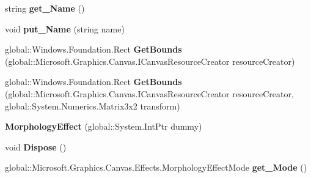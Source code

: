 \begin{DoxyCompactItemize}
\item 
\mbox{\label{class_microsoft_1_1_graphics_1_1_canvas_1_1_effects_1_1_morphology_effect_a255bc7bed18329d2c61fac107439dea6}} 
string {\bfseries get\+\_\+\+Name} ()
\item 
\mbox{\label{class_microsoft_1_1_graphics_1_1_canvas_1_1_effects_1_1_morphology_effect_a013f5c2e209a17200348842a621476bf}} 
void {\bfseries put\+\_\+\+Name} (string name)
\item 
\mbox{\label{class_microsoft_1_1_graphics_1_1_canvas_1_1_effects_1_1_morphology_effect_a4cc93d1ce89bb136bf248b44ce57e0cc}} 
global\+::\+Windows.\+Foundation.\+Rect {\bfseries Get\+Bounds} (global\+::\+Microsoft.\+Graphics.\+Canvas.\+I\+Canvas\+Resource\+Creator resource\+Creator)
\item 
\mbox{\label{class_microsoft_1_1_graphics_1_1_canvas_1_1_effects_1_1_morphology_effect_af73df5ff1be6441e88acfd8ace44c35a}} 
global\+::\+Windows.\+Foundation.\+Rect {\bfseries Get\+Bounds} (global\+::\+Microsoft.\+Graphics.\+Canvas.\+I\+Canvas\+Resource\+Creator resource\+Creator, global\+::\+System.\+Numerics.\+Matrix3x2 transform)
\item 
\mbox{\label{class_microsoft_1_1_graphics_1_1_canvas_1_1_effects_1_1_morphology_effect_a2d9ece50b1dd157dfb4ba3fd5a775b2b}} 
{\bfseries Morphology\+Effect} (global\+::\+System.\+Int\+Ptr dummy)
\item 
\mbox{\label{class_microsoft_1_1_graphics_1_1_canvas_1_1_effects_1_1_morphology_effect_a53c33ad9e69a2a3019abd0f92a5654ba}} 
void {\bfseries Dispose} ()
\item 
\mbox{\label{class_microsoft_1_1_graphics_1_1_canvas_1_1_effects_1_1_morphology_effect_abdb13862f058bf5f7dade04433564b08}} 
global\+::\+Microsoft.\+Graphics.\+Canvas.\+Effects.\+Morphology\+Effect\+Mode {\bfseries get\+\_\+\+Mode} ()

\end{DoxyCompactItemize}
